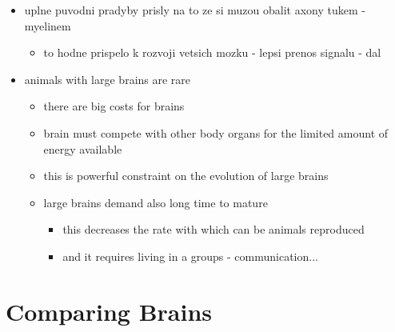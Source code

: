 \documentclass[journal,onecolumn]{IEEEtrancz}
\begin{document}
\begin{itemize}
	\item uplne puvodni pradyby prisly na to ze si muzou obalit axony tukem - myelinem
	\begin{itemize}
		\item to hodne prispelo k rozvoji vetsich mozku - lepsi prenos signalu - dal
			\vspace{3mm}
	\end{itemize}

	\item animals with large brains are rare
	\begin{itemize}
		\item there are big costs for brains
		\item brain must compete with other body organs for the limited amount of energy available
		\item this is powerful constraint on the evolution of large brains
			\vspace{3mm}
		\item large brains demand also long time to mature
		\begin{itemize}
			\item this decreases the rate with which can be animals reproduced
			\item and it requires living in a groups - communication...
		
		
\end{itemize}
	\end{itemize}
\end{itemize}
\section{Comparing Brains}
\end{document}
